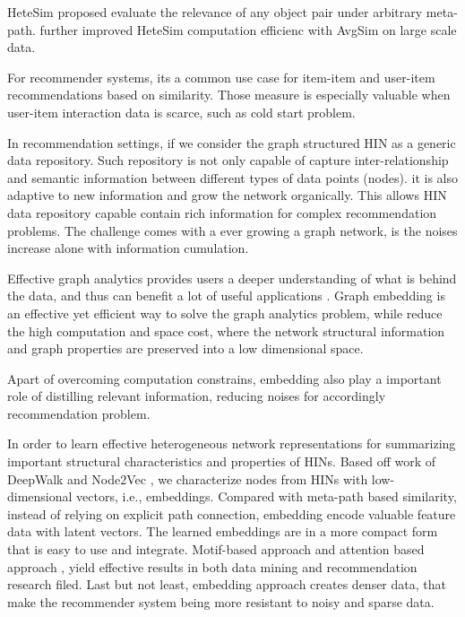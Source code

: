 HeteSim \citep{Shi2013HeteSim} proposed evaluate the relevance of any object pair under arbitrary meta-path. \citet{xiao2016avgsim} further improved HeteSim computation efficienc with AvgSim on large scale data.

For recommender systems, its a common use case for item-item and user-item recommendations based on similarity. Those measure is especially valuable when user-item interaction data is scarce, such as cold start problem. 

In recommendation settings, if we consider the graph structured HIN as a generic data repository. Such repository is not only capable of capture inter-relationship and semantic information between different types of data points (nodes). it is also adaptive to new information and grow the network organically. This allows HIN data repository capable contain rich information for complex recommendation problems. The challenge comes with a ever growing a graph network, is the noises increase alone with information cumulation.

Effective graph analytics provides users a deeper understanding of what is behind the data, and thus can benefit a lot of useful applications \citep{Cai2018}. Graph embedding is an effective yet efficient way to solve the graph analytics problem, while reduce the high computation and space cost, where the network structural information and graph properties are preserved into a low dimensional space.

Apart of overcoming computation constrains, embedding also play a important role of distilling relevant information, reducing noises for accordingly recommendation problem.

In order to learn effective heterogeneous network representations for summarizing important structural characteristics and properties of HINs. Based off work of DeepWalk \citep{perozzi2014deepwalk} and Node2Vec \citep{grover2016node2vec}, we characterize nodes from HINs with low-dimensional vectors, i.e., embeddings. 
Compared with meta-path based similarity, instead of relying on explicit path connection, embedding encode valuable feature data with latent vectors. The learned embeddings are in a more compact form that is easy to use and integrate. 
Motif-based approach \citep{tsourakakis2017scalable} and attention based approach \citep{Hu2018}, \citep{lee2018graph} yield effective results in both data mining and recommendation research filed.
Last but not least, embedding approach creates denser data, that make the recommender system being more resistant to noisy and sparse data. 

